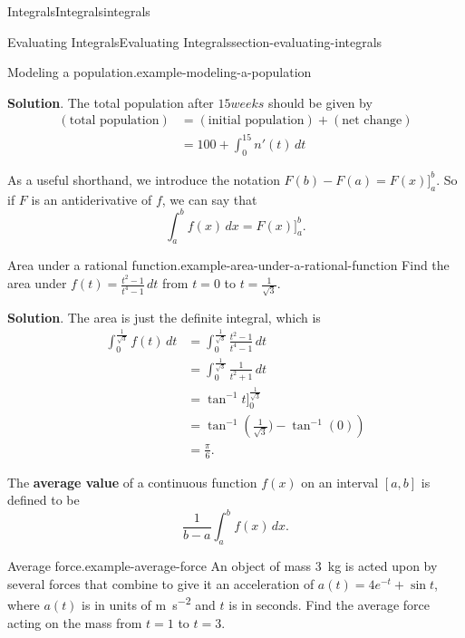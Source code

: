 \documentclass[oneside,10pt,]{book}
\newcommand{\terminology}[1]{\textbf{#1}}
\numberwithin{equation}{section}
\begin{document}
\begin{chapterptx}{Integrals}{}{Integrals}{}{}{integrals}
\begin{sectionptx}{Evaluating Integrals}{}{Evaluating Integrals}{}{}{section-evaluating-integrals}
\begin{example}{Modeling a population.}{example-modeling-a-population}
\par\smallskip%
\noindent\textbf{Solution}.\hypertarget{solution-97}{}\quad%
\hypertarget{p-448}{}%
The total population after \(15 weeks\) should be given by%
\begin{align*}
(\text{total population}) & = (\text{initial population}) + (\text{net change}) \\
& = 100 + \int_{0}^{15}n'(t)\,dt 
\end{align*}
%
\end{example}
\hypertarget{p-449}{}%
As a useful shorthand, we introduce the notation \(F(b) - F(a) = F(x)\big]_{a}^{b}.\) So if \(F\) is an antiderivative of \(f\), we can say that%
\begin{equation*}
\int_{a}^{b}f(x)\,dx = F(x)\big]_{a}^{b}.
\end{equation*}
%
\begin{example}{Area under a rational function.}{example-area-under-a-rational-function}%
\hypertarget{p-450}{}%
Find the area under \(f(t) = \frac{t^{2}-1}{t^{4}-1}\,dt\) from \(t=0\) to \(t=\frac{1}{\sqrt{3}}\).%
\par\smallskip%
\noindent\textbf{Solution}.\hypertarget{solution-98}{}\quad%
\hypertarget{p-451}{}%
The area is just the definite integral, which is%
\begin{align*}
\int_{0}^{\frac{1}{\sqrt{3}}}f(t)\,dt & = \int_{0}^{\frac{1}{\sqrt{3}}}\frac{t^{2}-1}{t^{4}-1}\,dt \\
& = \int_{0}^{\frac{1}{\sqrt{3}}}\frac{1}{t^{2}+1}\,dt \\
& = \tan^{-1}t\big]_{0}^{\frac{1}{\sqrt{3}}} \\
& = \tan^{-1}\left(\frac{1}{\sqrt{3}}) - \tan^{-1}(0)\right) \\
& = \frac{\pi}{6}. 
\end{align*}
%
\end{example}
\hypertarget{p-452}{}%
The \terminology{average value} of a continuous function \(f(x)\) on an interval \([a,b]\) is defined to be%
\begin{equation*}
\frac{1}{b-a}\int_{a}^{b}f(x)\,dx.
\end{equation*}
%
\begin{example}{Average force.}{example-average-force}%
\hypertarget{p-453}{}%
An object of mass \SI{3}{\kilo\gram} is acted upon by several forces that combine to give it an acceleration of \(a(t) = 4e^{-t} + \sin t\), where \(a(t)\) is in units of \si{\meter\per\second\tothe{2}} and \(t\) is in seconds. Find the average force acting on the mass from \(t=1\) to \(t=3\).%

\end{example}
\end{sectionptx}
\end{chapterptx}
\end{document}
